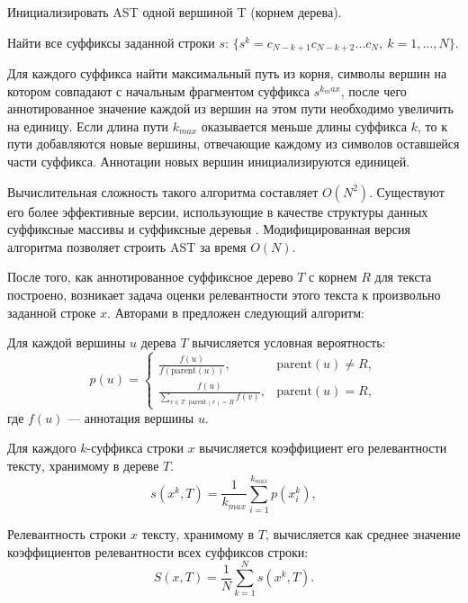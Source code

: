 \documentclass[12pt]{article}
\newenvironment{enumerate*}%
{\begin{enumerate}%
		\setlength{\itemsep}{0pt}%
		\setlength{\parskip}{0pt}}%
	{\end{enumerate}}
\begin{document}
\begin{enumerate*}
	\item Инициализировать AST одной вершиной T (корнем дерева).
	\item Найти все суффиксы заданной строки $s$: $\{s^k=c_{N-k+1}c_{N-k+2}\ldots c_{N}, \ k=1,\ldots, N\}$.
	\item Для каждого суффикса найти максимальный путь из корня, символы вершин на котором совпадают с начальным фрагментом суффикса $s^{k_max}$, после чего аннотированное значение каждой из вершин на этом пути необходимо увеличить на единицу. Если длина пути $k_{max}$ оказывается меньше длины суффикса $k$, то к пути добавляются новые вершины, отвечающие каждому из символов оставшейся части суффикса. Аннотации новых вершин инициализируются единицей.
\end{enumerate*}
Вычислительная сложность такого алгоритма составляет $O(N^2)$. Существуют его более эффективные версии, использующие в качестве структуры данных суффиксные массивы и суффиксные деревья \cite{Grossi_2005}. Модифицированная версия алгоритма позволяет строить AST за время $O(N)$.

После того, как аннотированное суффиксное дерево $T$ с корнем $R$ для текста построено, возникает задача оценки релевантности этого текста к произвольно заданной строке $x$. Авторами в \cite{MirkinChernyak2012} предложен следующий алгоритм:
\begin{enumerate*}
	
	\item  Для каждой вершины $u$ дерева $T$ вычисляется условная вероятность:
	{\sffamily
	\begin{equation}
		p(u)=\begin{cases}
			\displaystyle	\frac{f(u)}{f(\text{parent}(u))}, & \text{parent}(u) \ne R,\\[15pt]
			\displaystyle	\frac{f(u)}{\sum_{v\in T:\ \text{parent}(v)=R}f(v)}, & \text{parent}(u) = R,
		\end{cases}
	\end{equation}
	}
	где $f(u)$ --- аннотация вершины $u$. 
	\item Для каждого $k$-суффикса строки $x$ вычисляется коэффициент его релевантности тексту, хранимому в дереве $T$. 
	\begin{equation}
		s(x^k, T)=\frac{1}{k_{max}}\sum_{i=1}^{k_{max}}p(x_i^k),
	\end{equation}
	\item Релевантность строки $x$ тексту, хранимому в $T$, вычисляется как среднее значение коэффициентов релевантности всех суффиксов строки:
	\begin{equation}
		S(x,T)=\frac1N\sum_{k=1}^{N}s(x^k, T).
	\end{equation}
\end{enumerate*}
\end{document}
